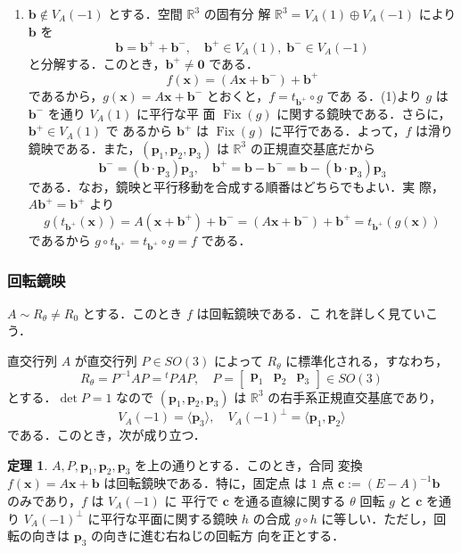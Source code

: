 \documentclass[11pt, uplatex, dvipdfmx, titlepage]{jsarticle}
\makeatletter
\DeclareMathOperator{\Fix}{Fix}
\renewenvironment{proof}[1][\proofname]{\par
  \pushQED{\qed}%
  \normalfont \topsep6\p@\@plus6\p@\relax
  \trivlist
  \item[\hskip\labelsep
         \bfseries
    {#1}]\ignorespaces
}{%
  \popQED\endtrivlist\@endpefalse
}
\theoremstyle{definition}
\newtheorem{theorem}{定理}[section]
\renewcommand{\proofname}{\textbf{証明}}
\makeatother
\begin{document}
\begin{proof}[定理\ref{thm:RefOrGlide3}の証明]
\begin{enumerate}[(1)]
  \item $\bm{b} \notin V_A(-1)$ とする．空間 $\mathbb{R}^3$ の固有分
    解 $\mathbb{R}^3 = V_A(1) \oplus V_A(-1)$ により $\bm{b}$ を
    \[
      \bm{b} = \bm{b}^{+} + \bm{b}^{-}, \quad \bm{b}^{+} \in V_A(1),
      \; \bm{b}^{-} \in V_A(-1)
    \]
    と分解する．このとき，$\bm{b}^{+} \neq \bm{0}$ である．
    \[
      f(\bm{x}) = \left(A\bm{x} + \bm{b}^{-}\right) + \bm{b}^{+}
    \]
    であるから，$g(\bm{x}) = A\bm{x} + \bm{b}^{-}$
    とおくと，$f = t_{\bm{b}^{+}} \circ g$ であ
    る．(1)より $g$ は $\bm{b}^{-}$ を通り $V_A(1)$ に平行な平
    面 $\Fix(g)$ に関する鏡映である．さらに，$\bm{b}^{+} \in V_A(1)$ で
    あるから $\bm{b}^{+}$ は $\Fix(g)$ に平行である．よって，$f$ は滑り
    鏡映である．また，$(\bm{p}_1, \bm{p}_2,
    \bm{p}_3)$ は $\mathbb{R}^3$ の正規直交基底だから
    \[
      \bm{b}^{-} = (\bm{b}\cdot \bm{p}_3)\bm{p}_3, \quad
      \bm{b}^{+}=\bm{b}-\bm{b}^{-}=\bm{b}-(\bm{b}\cdot \bm{p}_3)\bm{p}_3
    \]
    である．なお，鏡映と平行移動を合成する順番はどちらでもよい．実
    際，$A\bm{b}^{+}=\bm{b}^{+}$ より
    \[
      g\left(t_{\bm{b}^{+}}(\bm{x})\right) = A\left(\bm{x}+\bm{b}^{+}\right)+\bm{b}^{-}
      = \left(A\bm{x}+\bm{b}^{-}\right) + \bm{b}^{+} = t_{\bm{b}^{+}}\left( g(\bm{x})\right)
    \]
    であるから $g\circ t_{\bm{b}^{+}} = t_{\bm{b}^{+}}\circ g=f$ である．
  \end{enumerate}
\end{proof}


\subsubsection{回転鏡映}

$A \sim R_{\theta} \neq R_0$ とする．このとき $f$ は回転鏡映である．こ
れを詳しく見ていこう．

直交行列 $A$ が直交行列 $P \in SO(3)$ によって $R_{\theta}$ に標準化される，すなわち，
\[
  R_{\theta}=P^{-1}AP = {}^{t}PAP, \quad P=\left[
    \begin{array}{ccc}
      \bm{p}_1 & \bm{p}_2 & \bm{p}_3
    \end{array}
  \right] \in SO(3)
\]
とする．$\det P=1$ なので $(\bm{p}_1, \bm{p}_2,
\bm{p}_3)$ は $\mathbb{R}^3$ の右手系正規直交基底であり，
\[
  V_A(-1) = \langle \bm{p}_3\rangle, \quad V_A(-1)^{\perp}=\langle
  \bm{p}_1, \bm{p}_2\rangle
\]
である．このとき，次が成り立つ．

\begin{theorem}\label{thm:rotref3}
  $A, P, \bm{p}_1, \bm{p}_2, \bm{p}_3$ を上の通りとする．このとき，合同
  変換 $f(\bm{x}) = A\bm{x}+\bm{b}$ は回転鏡映である．特に，固定点
  は $1$ 点 $\bm{c}:=(E-A)^{-1}\bm{b}$ のみであり，$f$ は $V_A(-1)$ に
  平行で $\bm{c}$ を通る直線に関する $\theta$ 回転 $g$ と $\bm{c}$ を通
  り $V_A(-1)^{\perp}$ に平行な平面に関する鏡映 $h$ の合成 $g \circ h$
  に等しい．ただし，回転の向きは $\bm{p}_3$ の向きに進む右ねじの回転方
  向を正とする．
\end{theorem}
\end{document}
